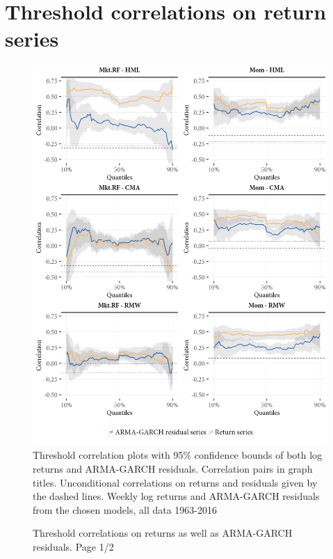 \appendix
\appendixpageoff
\section{Threshold correlations on return series}
\label{app:threshold_return}
\begin{figure}[H]
  \caption{Threshold correlations on returns as well as ARMA-GARCH residuals. Page 1/2}
  \label{fig:appendix_threshold1}
  \centering
  \begin{minipage}{\textwidth}
  \includegraphics[scale=1]{graphics/appendix_threshold_1.png}  
  \vspace{3mm}
  \footnotesize
  Threshold correlation plots with 95\% confidence bounds of both log returns and ARMA-GARCH residuals. Correlation pairs in graph titles. Unconditional correlations on returns and residuals given by the dashed lines. Weekly log returns and ARMA-GARCH residuals from the chosen models, all data 1963-2016
  \end{minipage}
\end{figure}
